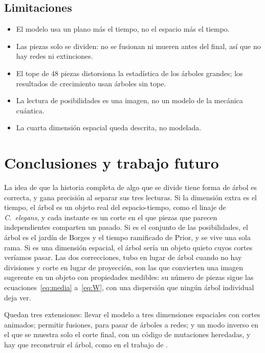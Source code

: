 \documentclass[11pt,a4paper]{article}
\begin{document}
\subsection{Limitaciones}

\begin{itemize}
\item El modelo usa un plano más el tiempo, no el espacio más el tiempo.
\item Las piezas solo se dividen: no se fusionan ni mueren antes del final, así que no hay redes ni extinciones.
\item El tope de 48 piezas distorsiona la estadística de los árboles grandes; los resultados de crecimiento usan árboles sin tope.
\item La lectura de posibilidades es una imagen, no un modelo de la mecánica cuántica.
\item La cuarta dimensión espacial queda descrita, no modelada.
\end{itemize}

\section{Conclusiones y trabajo futuro}\label{sec:conclusiones}

La idea de que la historia completa de algo que se divide tiene forma de árbol es correcta, y gana precisión al separar sus tres lecturas. Si la dimensión extra es el tiempo, el árbol es un objeto real del espacio-tiempo, como el linaje de \emph{C.~elegans}, y cada instante es un corte en el que piezas que parecen independientes comparten un pasado. Si es el conjunto de las posibilidades, el árbol es el jardín de Borges y el tiempo ramificado de Prior, y se vive una sola rama. Si es una dimensión espacial, el árbol sería un objeto quieto cuyos cortes veríamos pasar. Las dos correcciones, tubo en lugar de árbol cuando no hay divisiones y corte en lugar de proyección, son las que convierten una imagen sugerente en un objeto con propiedades medibles: su número de piezas sigue las ecuaciones~\eqref{eq:media} a~\eqref{eq:W}, con una dispersión que ningún árbol individual deja ver.

Quedan tres extensiones: llevar el modelo a tres dimensiones espaciales con cortes animados; permitir fusiones, para pasar de árboles a redes; y un modo inverso en el que se muestra solo el corte final, con un código de mutaciones heredadas, y hay que reconstruir el árbol, como en el trabajo de \textcite{mckenna2016}.
\end{document}
